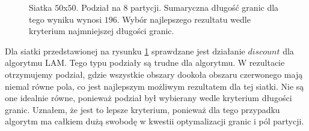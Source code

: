 \begin{figure}[h]
\begin{subfigure}{.33\textwidth}
    \caption[short]{}
\end{subfigure}
\caption{Siatka $50$x$50$. Podział na $8$ partycji. Sumaryczna długość granic dla tego wyniku wynosi $196$.
Wybór najlepszego rezultatu wedle kryterium najmniejszej długości granic.}
\label{result:5}
\end{figure}

Dla siatki przedstawionej na rysunku \ref{result:5} sprawdzane jest działanie $discount$ dla algorytmu LAM.
Tego typu podziały są trudne dla algorytmu.
W rezultacie otrzymujemy podział, gdzie wszystkie obszary dookoła obszaru czerwonego mają niemal równe pola, co jest
najlepszym możliwym rezultatem dla tej siatki.
Nie są one idealnie równe, ponieważ podział był wybierany wedle kryterium długości granic.
Uznałem, że jest to lepsze kryterium, ponieważ dla tego przypadku algorytm ma całkiem dużą swobodę w kwestii optymalizacji granic i
pól partycji.

